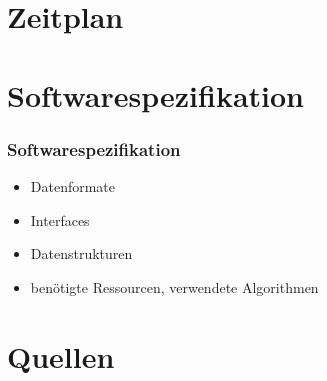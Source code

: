\documentclass[11pt,a4paper]{beamer}
\begin{document}
\section{Zeitplan}

\begin{frame}

    \begin{gantt}{10}{9}
    \begin{ganttitle}
    \end{ganttitle}
    \begin{ganttitle}
    \end{ganttitle}
  \end{gantt}
  
\end{frame}


\section{Softwarespezifikation}

\begin{frame}
\frametitle{Softwarespezifikation}

\begin{itemize}

	\item Datenformate
	\item Interfaces
	\item Datenstrukturen
	\item benötigte Ressourcen, verwendete Algorithmen

\end{itemize}

\end{frame}

\section{Quellen}
\end{document}
